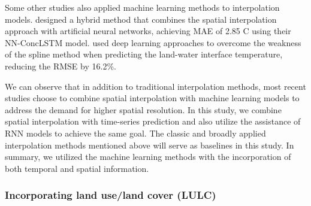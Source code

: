 \documentclass[a4paper,fleqn]{cas-sc}
\begin{document}
Some other studies also applied machine learning methods to interpolation models. \cite{Kartal2022prediction} designed a hybrid method that combines the spatial interpolation approach with artificial neural networks, achieving MAE of 2.85 \textdegree C using their NN-ConcLSTM model. \cite{imanian2023spatial} used deep learning approaches to overcome the weakness of the spline method when predicting the land-water interface temperature, reducing the RMSE by 16.2\%. 

We can observe that in addition to traditional interpolation methods, most recent studies choose to combine spatial interpolation with machine learning models to address the demand for higher spatial resolution. In this study, we combine spatial interpolation with time-series prediction and also utilize the assistance of RNN models to achieve the same goal. The classic and broadly applied interpolation methods mentioned above will serve as baselines in this study. In summary, we utilized the machine learning methods with the incorporation of both temporal and spatial information.

\subsubsection{Incorporating land use/land cover (LULC)}
\end{document}
